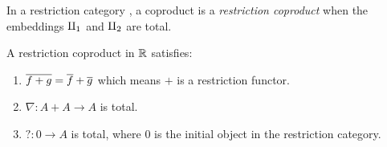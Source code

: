 \begin{definition}\label{def:restriction_coproduct}
  In a restriction category \R, a coproduct is a \emph{restriction coproduct} when the embeddings
  $\amalg_{1}$ and $\amalg_{2}$ are total.
\end{definition}
\begin{lemma}\label{lem:restriction_coproduct_is_restriction_functor}
  A restriction coproduct in $\mathbb{R}$ satisfies:
  \begin{enumerate}[{(}i{)}]
    \item $\overline{f+g} = \overline{f} + \overline{g}$ which means $+$ is a restriction functor.
    \item $\nabla:A+A\to A$ is total.
    \item $?:0 \to A$ is total, where $0$ is the initial object in the restriction category.
  \end{enumerate}
\end{lemma}

